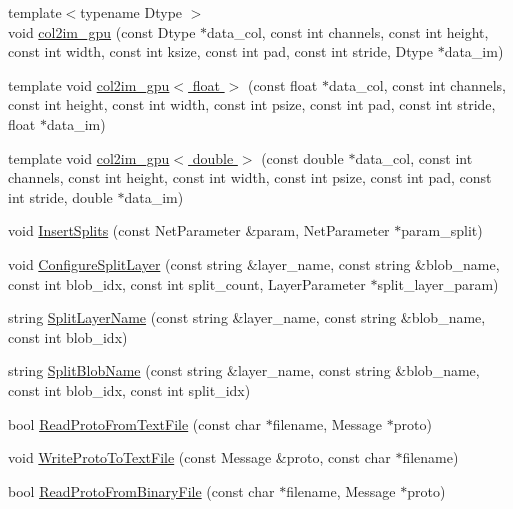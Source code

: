 \begin{DoxyCompactItemize}
\item 
{\footnotesize template$<$typename Dtype $>$ }\\void \hyperlink{namespacecaffe_a4604c45fdbee27b1591a047541218308}{col2im\+\_\+gpu} (const Dtype $\ast$data\+\_\+col, const int channels, const int height, const int width, const int ksize, const int pad, const int stride, Dtype $\ast$data\+\_\+im)
\item 
template void \hyperlink{namespacecaffe_a864bc0e9898dad8473cf1b592c8c1991}{col2im\+\_\+gpu$<$ float $>$} (const float $\ast$data\+\_\+col, const int channels, const int height, const int width, const int psize, const int pad, const int stride, float $\ast$data\+\_\+im)
\item 
template void \hyperlink{namespacecaffe_a9cb148184e75df535d299185583db7dc}{col2im\+\_\+gpu$<$ double $>$} (const double $\ast$data\+\_\+col, const int channels, const int height, const int width, const int psize, const int pad, const int stride, double $\ast$data\+\_\+im)
\item 
void \hyperlink{namespacecaffe_a3496a2d5b76ce0e58d9888c9ccace709}{Insert\+Splits} (const Net\+Parameter \&param, Net\+Parameter $\ast$param\+\_\+split)
\item 
void \hyperlink{namespacecaffe_ad96029c91095a32df4719329729ff196}{Configure\+Split\+Layer} (const string \&layer\+\_\+name, const string \&blob\+\_\+name, const int blob\+\_\+idx, const int split\+\_\+count, Layer\+Parameter $\ast$split\+\_\+layer\+\_\+param)
\item 
string \hyperlink{namespacecaffe_a474555bb59481bf56abf5982dc5f7cd5}{Split\+Layer\+Name} (const string \&layer\+\_\+name, const string \&blob\+\_\+name, const int blob\+\_\+idx)
\item 
string \hyperlink{namespacecaffe_ab4227137f8f8a1a442cb9be8493df381}{Split\+Blob\+Name} (const string \&layer\+\_\+name, const string \&blob\+\_\+name, const int blob\+\_\+idx, const int split\+\_\+idx)
\item 
bool \hyperlink{namespacecaffe_ab384abf6f635e4c5e2a779a5ec8223b6}{Read\+Proto\+From\+Text\+File} (const char $\ast$filename, Message $\ast$proto)
\item 
void \hyperlink{namespacecaffe_aa2f483e4300ceff4497891db10371056}{Write\+Proto\+To\+Text\+File} (const Message \&proto, const char $\ast$filename)
\item 
bool \hyperlink{namespacecaffe_a28f2320f8f918424c3b3de6263cf9373}{Read\+Proto\+From\+Binary\+File} (const char $\ast$filename, Message $\ast$proto)
\item 

\end{DoxyCompactItemize}
